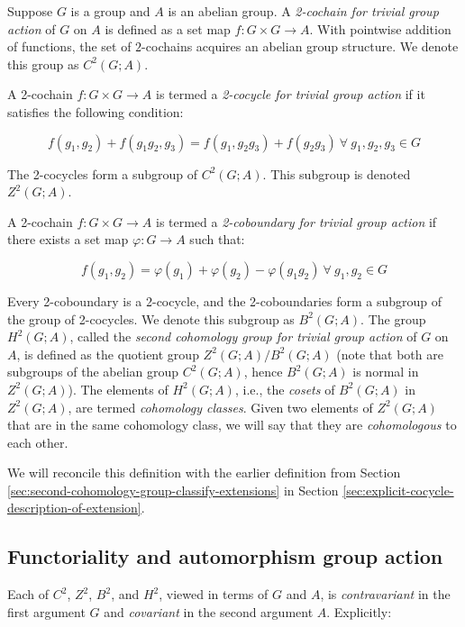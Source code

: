 Suppose $G$ is a group and $A$ is an abelian group. A {\em 2-cochain
  for trivial group action} of $G$ on $A$ is defined as a set map $f:
G \times G \to A$. With pointwise addition of functions, the set of
$2$-cochains acquires an abelian group structure. We denote this group
as $C^2(G;A)$.

A 2-cochain $f:G \times G \to A$ is termed a {\em 2-cocycle for
  trivial group action} if it satisfies the following condition:

$$f(g_1,g_2) + f(g_1g_2,g_3) = f(g_1,g_2g_3) + f(g_2g_3) \ \forall \ g_1,g_2,g_3 \in G$$

The 2-cocycles form a subgroup of $C^2(G;A)$. This subgroup is denoted
$Z^2(G;A)$.

A 2-cochain $f:G \times G \to A$ is termed a {\em 2-coboundary for
  trivial group action} if there exists a set map $\varphi:G \to A$
such that:

$$f(g_1,g_2) = \varphi(g_1) + \varphi(g_2) - \varphi(g_1g_2)\ \forall \ g_1,g_2 \in G$$

Every 2-coboundary is a 2-cocycle, and the 2-coboundaries form a
subgroup of the group of 2-cocycles. We denote this subgroup as
$B^2(G;A)$. The group $H^2(G;A)$, called the {\em second cohomology
  group for trivial group action} of $G$ on $A$, is defined as the
quotient group $Z^2(G;A)/B^2(G;A)$ (note that both are subgroups of
the abelian group $C^2(G;A)$, hence $B^2(G;A)$ is normal in
$Z^2(G;A)$). The elements of $H^2(G;A)$, i.e., the {\em cosets} of
$B^2(G;A)$ in $Z^2(G;A)$, are termed {\em cohomology classes}. Given
two elements of $Z^2(G;A)$ that are in the same cohomology class, we
will say that they are {\em cohomologous} to each other.

We will reconcile this definition
with the earlier definition from Section \ref{sec:second-cohomology-group-classify-extensions} in Section \ref{sec:explicit-cocycle-description-of-extension}.

\subsection{Functoriality and automorphism group action}

Each of $C^2$, $Z^2$, $B^2$, and $H^2$, viewed in terms of $G$ and
$A$, is {\em contravariant} in the first argument $G$ and {\em
  covariant} in the second argument $A$. Explicitly:

